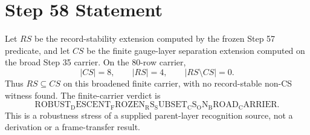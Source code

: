 \documentclass[11pt]{article}
\begin{document}
\section*{Step 58 Statement}
Let \(RS\) be the record-stability extension computed by the frozen Step 57 predicate, and let \(CS\) be the finite gauge-layer separation extension computed on the broad Step 35 carrier. On the 80-row carrier,
\[
  |CS| = 8,\qquad |RS| = 4,\qquad |RS\setminus CS| = 0.
\]
Thus \(RS \subseteq CS\) on this broadened finite carrier, with no record-stable non-CS witness found. The finite-carrier verdict is
\[
  \mathrm{ROBUST_DESCENT_FROZEN_RS_SUBSET_CS_ON_BROAD_CARRIER}.
\]
This is a robustness stress of a supplied parent-layer recognition source, not a derivation or a frame-transfer result.
\end{document}
